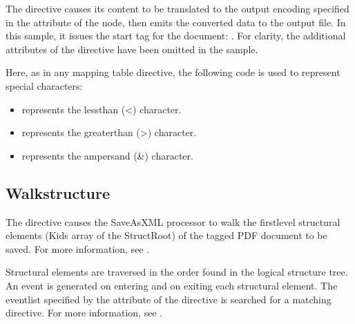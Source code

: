 \documentclass[letterpaper,12pt,english,openany,oneside]{sphinxmanual}
\begin{document}
The  directive causes its content to be translated to the output encoding specified in the  attribute of the  node, then emits the converted data to the output file. In this sample, it issues the start tag for the document: . For clarity, the additional attributes of the  directive have been omitted in the sample.

Here, as in any mapping table directive, the following code is used to represent special characters:
\begin{itemize}
\item {} 
 represents the less\sphinxhyphen{}than (<) character.

\item {} 
 represents the greater\sphinxhyphen{}than (>) character.

\item {} 
 represents the ampersand (\&) character.

\end{itemize}


\subsection{Walk\sphinxhyphen{}structure}
\label{\detokenize{index:walk-structure}}
\begin{sphinxVerbatim}[commandchars=\\\{\}]
   
\end{sphinxVerbatim}

The  directive causes the SaveAsXML processor to walk the first\sphinxhyphen{}level structural elements (Kids array of the StructRoot) of the tagged PDF document to be saved. For more information, see .

Structural elements are traversed in the order found in the logical structure tree. An event is generated on entering and on exiting each structural element. The event\sphinxhyphen{}list specified by the  attribute of the  directive is searched for a matching  directive. For more information, see .
\end{document}
